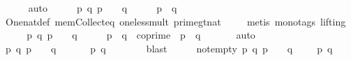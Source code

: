 \begin{isabellebody}
\ \ \ \ \isamarkupfalse%
\ auto\isanewline
\ \ \isamarkupfalse%
\ \isamarkupfalse%
\ {\isachardoublequoteopen}{\isasymAnd}p\ q{\isachardot}{\kern0pt}\ {\isacharparenleft}{\kern0pt}p\ {\isasymin}\ {\isacharquery}{\kern0pt}{\isasymK}\ {\isasymand}\ q\ {\isasymin}\ {\isacharquery}{\kern0pt}{\isasymK}{\isacharparenright}{\kern0pt}\ {\isasymlongrightarrow}\ {}\ {\isacharless}{\kern0pt}\ p\ {\isacharasterisk}{\kern0pt}\ q{\isachardoublequoteclose}\ \isanewline
\ \ \ \isamarkupfalse%
\ One{\isacharunderscore}{\kern0pt}nat{\isacharunderscore}{\kern0pt}def\ mem{\isacharunderscore}{\kern0pt}Collect{\isacharunderscore}{\kern0pt}eq\ one{\isacharunderscore}{\kern0pt}less{\isacharunderscore}{\kern0pt}mult\ prime{\isacharunderscore}{\kern0pt}gt{\isacharunderscore}{\kern0pt}{}{\isacharunderscore}{\kern0pt}nat\isanewline
\ \ \ \isamarkupfalse%
\ {\isacharparenleft}{\kern0pt}metis\ {\isacharparenleft}{\kern0pt}mono{\isacharunderscore}{\kern0pt}tags{\isacharcomma}{\kern0pt}\ lifting{\isacharparenright}{\kern0pt}{\isacharparenright}{\kern0pt}\isanewline
\ \ \isamarkupfalse%
\ \isamarkupfalse%
\ {\isachardoublequoteopen}{\isasymAnd}p\ q{\isachardot}{\kern0pt}\ {\isacharparenleft}{\kern0pt}p\ {\isasymin}\ {\isacharquery}{\kern0pt}{\isasymK}\ {\isasymand}\ q\ {\isasymin}\ {\isacharquery}{\kern0pt}{\isasymK}{\isacharparenright}{\kern0pt}\ {\isasymlongrightarrow}\ {}\ {\isacharless}{\kern0pt}\ p\ {\isacharasterisk}{\kern0pt}\ q\ {\isasymand}\ coprime\ {}\ {\isacharparenleft}{\kern0pt}p\ {\isacharasterisk}{\kern0pt}\ q{\isacharparenright}{\kern0pt}{\isachardoublequoteclose}\ \isanewline
\ \ \ \ \isamarkupfalse%
\ auto\isanewline
\ \ \isamarkupfalse%
\ \isamarkupfalse%
\ {\isachardoublequoteopen}{\isasymAnd}p\ q{\isachardot}{\kern0pt}\ {\isacharparenleft}{\kern0pt}p\ {\isasymin}\ {\isacharquery}{\kern0pt}{\isasymK}\ {\isasymand}\ q\ {\isasymin}\ {\isacharquery}{\kern0pt}{\isasymK}{\isacharparenright}{\kern0pt}\ {\isasymlongrightarrow}\ {}\ {\isasymin}\ {\isacharquery}{\kern0pt}{\isasymZ}\ p\ q{\isachardoublequoteclose}\ \ \isanewline
\ \ \ \ \isamarkupfalse%
\ blast\isanewline
\ \ \isamarkupfalse%
\ \isamarkupfalse%
\ {\isasymZ}{\isacharunderscore}{\kern0pt}not{\isacharunderscore}{\kern0pt}empty{\isacharcolon}{\kern0pt}\ {\isachardoublequoteopen}{\isasymAnd}p\ q{\isachardot}{\kern0pt}\ {\isacharparenleft}{\kern0pt}p\ {\isasymin}\ {\isacharquery}{\kern0pt}{\isasymK}\ {\isasymand}\ q\ {\isasymin}\ {\isacharquery}{\kern0pt}{\isasymK}{\isacharparenright}{\kern0pt}\ {\isasymLongrightarrow}\ {\isacharquery}{\kern0pt}{\isasymZ}\ p\ q\ {\isasymnoteq}\ {\isacharbraceleft}{\kern0pt}{\isacharbraceright}{\kern0pt}{\isachardoublequoteclose}\ \isanewline

\end{isabellebody}
